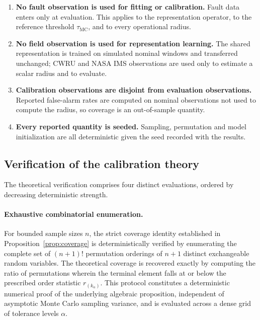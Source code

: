 \documentclass[a4paper]{cas-sc}
\newcommand{\residual}{\ensuremath{r}}
\newcommand{\taumc}{\ensuremath{\tau_{\mathrm{MC}}}}
\begin{document}
\begin{enumerate}[leftmargin=1.8em]
\item \textbf{No fault observation is used for fitting or calibration.} Fault
      data enters only at evaluation. This applies to the representation
      operator, to the reference threshold \(\taumc\), and to every
      operational radius.
\item \textbf{No field observation is used for representation learning.} The
      shared representation is trained on simulated nominal windows and
      transferred unchanged; CWRU and NASA IMS observations are used only to
      estimate a scalar radius and to evaluate.
\item \textbf{Calibration observations are disjoint from evaluation
      observations.} Reported false-alarm rates are computed on nominal
      observations not used to compute the radius, so coverage is an
      out-of-sample quantity.
\item \textbf{Every reported quantity is seeded.} Sampling, permutation and
      model initialization are all deterministic given the seed recorded with
      the results.
\end{enumerate}

\subsection{Verification of the calibration theory}
\label{subsec:design_verification}

The theoretical verification comprises four distinct evaluations, ordered by decreasing deterministic strength.

\paragraph{Exhaustive combinatorial enumeration.}
For bounded sample sizes \(n\), the strict coverage identity established in Proposition~\ref{prop:coverage} is deterministically verified by enumerating the complete set of \((n+1)!\) permutation orderings of \(n+1\) distinct exchangeable random variables. The theoretical coverage is recovered exactly by computing the ratio of permutations wherein the terminal element falls at or below the prescribed order statistic \(\residual_{(k_\alpha)}\). This protocol constitutes a deterministic numerical proof of the underlying algebraic proposition, independent of asymptotic Monte Carlo sampling variance, and is evaluated across a dense grid of tolerance levels \(\alpha\).
\end{document}
